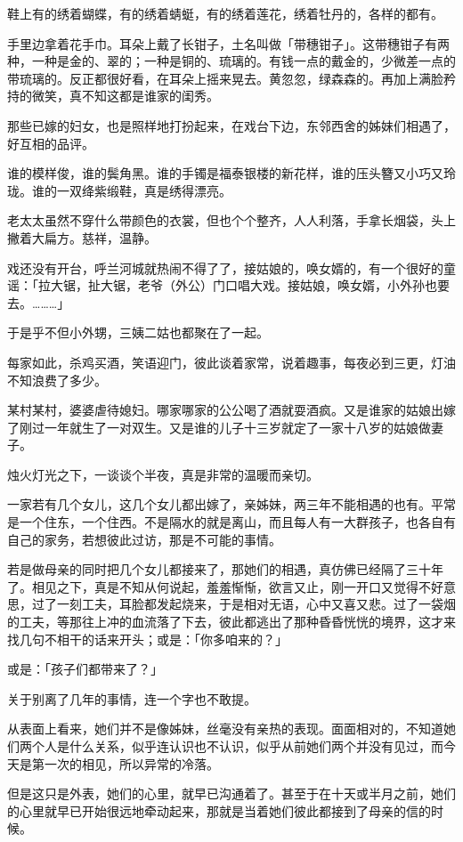 \documentclass[UTF8]{ctexart}
\begin{document}
鞋上有的绣着蝴蝶，有的绣着蜻蜓，有的绣着莲花，绣着牡丹的，各样的都有。

手里边拿着花手巾。耳朵上戴了长钳子，土名叫做「带穗钳子」。这带穗钳子有两种，一种是金的、翠的；一种是铜的、琉璃的。有钱一点的戴金的，少微差一点的带琉璃的。反正都很好看，在耳朵上摇来晃去。黄忽忽，绿森森的。再加上满脸矜持的微笑，真不知这都是谁家的闺秀。

那些已嫁的妇女，也是照样地打扮起来，在戏台下边，东邻西舍的姊妹们相遇了，好互相的品评。

谁的模样俊，谁的鬓角黑。谁的手镯是福泰银楼的新花样，谁的压头簪又小巧又玲珑。谁的一双绛紫缎鞋，真是绣得漂亮。

老太太虽然不穿什么带颜色的衣裳，但也个个整齐，人人利落，手拿长烟袋，头上撇着大扁方。慈祥，温静。

戏还没有开台，呼兰河城就热闹不得了了，接姑娘的，唤女婿的，有一个很好的童谣：「拉大锯，扯大锯，老爷（外公）门口唱大戏。接姑娘，唤女婿，小外孙也要去。………」

于是乎不但小外甥，三姨二姑也都聚在了一起。

每家如此，杀鸡买酒，笑语迎门，彼此谈着家常，说着趣事，每夜必到三更，灯油不知浪费了多少。

某村某村，婆婆虐待媳妇。哪家哪家的公公喝了酒就耍酒疯。又是谁家的姑娘出嫁了刚过一年就生了一对双生。又是谁的儿子十三岁就定了一家十八岁的姑娘做妻子。

烛火灯光之下，一谈谈个半夜，真是非常的温暖而亲切。

一家若有几个女儿，这几个女儿都出嫁了，亲姊妹，两三年不能相遇的也有。平常是一个住东，一个住西。不是隔水的就是离山，而且每人有一大群孩子，也各自有自己的家务，若想彼此过访，那是不可能的事情。

若是做母亲的同时把几个女儿都接来了，那她们的相遇，真仿佛已经隔了三十年了。相见之下，真是不知从何说起，羞羞惭惭，欲言又止，刚一开口又觉得不好意思，过了一刻工夫，耳脸都发起烧来，于是相对无语，心中又喜又悲。过了一袋烟的工夫，等那往上冲的血流落了下去，彼此都逃出了那种昏昏恍恍的境界，这才来找几句不相干的话来开头；或是：「你多咱来的？」

或是：「孩子们都带来了？」

关于别离了几年的事情，连一个字也不敢提。

从表面上看来，她们并不是像姊妹，丝毫没有亲热的表现。面面相对的，不知道她们两个人是什么关系，似乎连认识也不认识，似乎从前她们两个并没有见过，而今天是第一次的相见，所以异常的冷落。

但是这只是外表，她们的心里，就早已沟通着了。甚至于在十天或半月之前，她们的心里就早已开始很远地牵动起来，那就是当着她们彼此都接到了母亲的信的时候。
\end{document}
